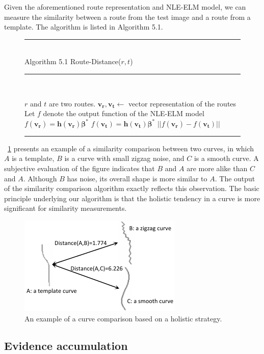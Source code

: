 \documentclass[journal]{IEEEtran}
\newenvironment{myalgorithm}[1]%
{\begin{figure}[!h]\small\noindent\rule{\linewidth}{1pt}\\#1\vspace{-0.5em}\\%
\rule{\linewidth}{0.5pt}\\\vspace{-1.5em}}%
{\vspace{-0.5em}\rule{\linewidth}{1pt}\end{figure}}
\begin{document}
Given the aforementioned route representation and NLE-ELM model,
we can measure the similarity between a route from the test image and a route from a template.
The algorithm is listed in Algorithm 5.1.

\begin{myalgorithm}{Algorithm 5.1 Route-Distance($r,t$)}
\begin{algorithmic}[1]
\REQUIRE $r$ and $t$ are two routes.
\STATE $\boldsymbol{v_r,v_t}\leftarrow$ vector representation of the routes
\STATE Let $f$ denote the output function of the NLE-ELM model
\STATE $f(\boldsymbol{v_r})=\boldsymbol{h}(\boldsymbol{v_r})\boldsymbol\beta^{*}$
\STATE $f(\boldsymbol{v_t})=\boldsymbol{h}(\boldsymbol{v_t})\boldsymbol\beta^{*}$
\RETURN $||f(\boldsymbol{v_r})-f(\boldsymbol{v_t})||$
\end{algorithmic}
\end{myalgorithm}

\figurename~\ref{fig:13} presents an example of a similarity comparison between two curves,
in which $A$ is a template, $B$ is a curve with small zigzag noise, and $C$ is a smooth curve. 
A subjective evaluation of the figure indicates that $B$ and $A$ are more alike than $C$ and $A$. 
Although $B$ has noise, its overall shape is more similar to $A$. 
The output of the similarity comparison algorithm exactly reflects this observation. 
The basic principle underlying our algorithm is that the holistic tendency in a curve is more significant for similarity measurements. 

\begin{figure}[!t]
\centering
\includegraphics[width=0.6\linewidth]{images/fig13.pdf}
\caption{An example of a curve comparison based on a holistic strategy.}
\label{fig:13}
\end{figure}

\subsection{Evidence accumulation}
\end{document}
